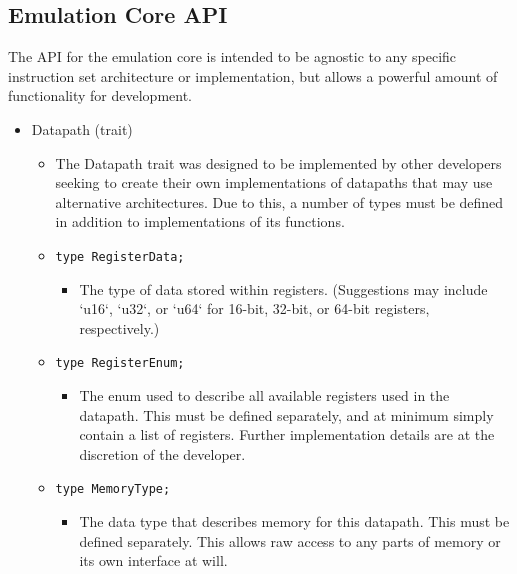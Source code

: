 \documentclass[
    parskip=half,
    fontsize=12pt,
    titlepage=firstiscover,
    toc=bibliography,
    numbers=endperiod
]{scrartcl}
\providecommand{\tightlist}{%
  \setlength{\itemsep}{0pt}\setlength{\parskip}{0pt}}
\begin{document}

\subsection{Emulation Core API}
\label{subsec:emulation-core-api}

The API for the emulation core is intended to be agnostic to any
specific instruction set architecture or implementation, but allows a
powerful amount of functionality for development.

\begin{itemize}
    \tightlist
    \item Datapath (trait)
    \begin{itemize}
        \tightlist
        \item The Datapath trait was designed to be implemented by other
            developers seeking to create their own implementations of datapaths
            that may use alternative architectures. Due to this, a number of
            types must be defined in addition to implementations of its
            functions.
        \item \texttt{type RegisterData;}
        \begin{itemize}
            \tightlist
                \item The type of data stored within registers. (Suggestions may include
                `u16`, `u32`, or `u64` for 16-bit, 32-bit, or 64-bit registers,
                respectively.)
        \end{itemize}
        \item \texttt{type RegisterEnum;}
        \begin{itemize}
            \tightlist
            \item The enum used to describe all available registers used in the
            datapath. This must be defined separately, and at minimum simply
            contain a list of registers. Further implementation details are at
            the discretion of the developer.
        \end{itemize}
        \item \texttt{type MemoryType;}
        \begin{itemize}
            \tightlist
            \item The data type that describes memory for this datapath. This must
            be defined separately. This allows raw access to any parts of
            memory or its own interface at will.
        \end{itemize}

\end{itemize}
\end{itemize}
\end{document}
